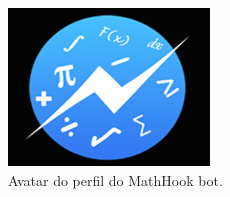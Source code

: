 \begin{figure}[h!tbp]
    \centering
    \includegraphics[width=0.4\linewidth]{img/bot1_logo.png}
    \caption{Avatar do perfil do MathHook bot.}
    \label{fig:bot1_logo}
\end{figure}